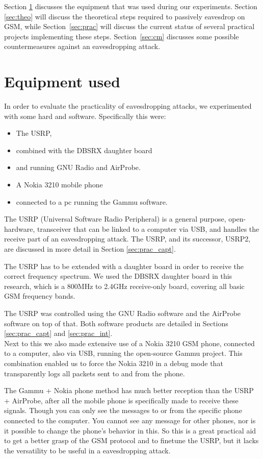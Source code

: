 \documentclass[a4paper,11pt]{llncs}
\begin{document}
Section \ref{sec:equip} discusses the equipment that was used during our experiments. Section \ref{sec:theo} will discuss the theoretical steps required to passively eavesdrop on GSM, while Section~\ref{sec:prac} will discuss the current status of several practical projects implementing these steps. Section~\ref{sec:cm} discusses some possible countermeasures against an eavesdropping attack.

\section{Equipment used}\label{sec:equip}
In order to evaluate the practicality of eavesdropping attacks, we experimented with some hard and software. Specifically this were:
\begin{itemize}
\item The USRP,
\item combined with the DBSRX daughter board
\item and running GNU Radio and AirProbe.
\end{itemize}
\begin{itemize}
\item A Nokia 3210 mobile phone
\item connected to a pc running the Gammu software.
\end{itemize}
The USRP (Universal Software Radio Peripheral) is a general purpose, open-hardware, transceiver that can be linked to a computer via USB, and handles the receive part of an eavesdropping attack. The USRP, and its successor, USRP2, are discussed in more detail in Section \ref{sec:prac_capt}.

The USRP has to be extended with a daughter board in order to receive the correct frequency spectrum. We used the DBSRX daughter board in this research, which is a 800MHz to 2.4GHz receive-only board, covering all basic GSM frequency bands.

The USRP was controlled using the GNU Radio software and the AirProbe software on top of that. Both software products are detailed in Sections \ref{sec:prac_capt} and \ref{sec:prac_int}.\\

Next to this we also made extensive use of a Nokia 3210 GSM phone, connected to a computer, also via USB, running the open-source Gammu \cite{url:Gammu} project. This combination enabled us to force the Nokia 3210 in a debug mode that transparently logs all packets sent to and from the phone. 

The Gammu + Nokia phone method has much better reception than the USRP + AirProbe, after all the mobile phone is specifically made to receive these signals. Though you can only see the messages to or from the specific phone connected to the computer. You cannot see any message for other phones, nor is it possible to change the phone's behavior in this. So this is a great practical aid to get a better grasp of the GSM protocol and to finetune the USRP, but it lacks the versatility to be useful in a eavesdropping attack.
\end{document}
